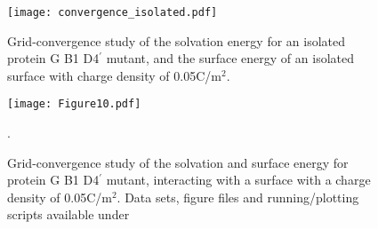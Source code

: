 \begin{figure}[h] %
   \centering
   \texttt{[image: convergence\_isolated.pdf]} 
   \caption{Grid-convergence study of the solvation energy for an isolated protein G B1 D4$^{\prime}$ mutant, and the surface energy of an isolated surface with charge density of 0.05C/m$^2$.}
   \label{fig:convergence_1PGB_isolated}
\end{figure}

\begin{figure}[h] %
   \centering
   \texttt{[image: Figure10.pdf]} 
   \caption{Grid-convergence study of the solvation and surface energy for protein G B1 D4$^{\prime}$ mutant, interacting with a surface with a charge density of 0.05C/m$^2$. Data sets, figure files and running/plotting scripts available under \ccby \cite{CooperBarba2015-share1348803}}.
   \label{fig:convergence_1PGB_sensor}
\end{figure}
